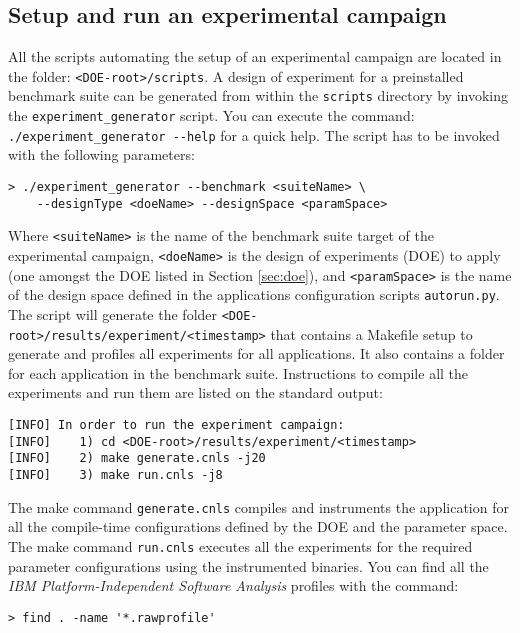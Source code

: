 \documentclass[a4paper, 10pt]{article}
\begin{document}
\subsection{Setup and run an experimental campaign}
\label{sec:generateExperiments}

All the scripts automating the setup
of an experimental campaign are located
in the folder: \verb!<DOE-root>/scripts!.
A design of experiment for a preinstalled benchmark suite can be generated from within the \verb!scripts! directory by invoking
the \verb!experiment_generator! script. You can execute the command: \verb!./experiment_generator --help! for a quick help.
The script has to be invoked with the following parameters:

\begin{Verbatim}[obeytabs, tabsize=4]
> ./experiment_generator --benchmark <suiteName> \
	--designType <doeName> --designSpace <paramSpace>
\end{Verbatim}

Where \verb!<suiteName>! is the name of the benchmark suite target of the experimental campaign, \verb!<doeName>! is
the design of experiments (DOE) to apply (one amongst the DOE listed in Section \ref{sec:doe}), and \verb!<paramSpace>!
is the name of the design space defined in the applications configuration scripts \verb!autorun.py!.
The script will generate the folder \verb!<DOE-root>/results/experiment/<timestamp>! that contains a Makefile setup to generate
and profiles all experiments for all applications. It also contains a folder for each application in the benchmark suite.
Instructions to compile all the experiments and run them are listed on the standard output:

\begin{Verbatim}[obeytabs, tabsize=4, frame=lines]
[INFO] In order to run the experiment campaign:
[INFO]    1) cd <DOE-root>/results/experiment/<timestamp>
[INFO]    2) make generate.cnls -j20
[INFO]    3) make run.cnls -j8
\end{Verbatim}

The make command \verb!generate.cnls! compiles and instruments the application for all the compile-time configurations defined
by the DOE and the parameter space. The make command \verb!run.cnls! executes all the experiments for the required parameter configurations
using the instrumented binaries. You can find all the \textit{IBM Platform-Independent Software Analysis} profiles with the command:

\begin{Verbatim}[obeytabs, tabsize=4]
> find . -name '*.rawprofile'
\end{Verbatim}
\end{document}
